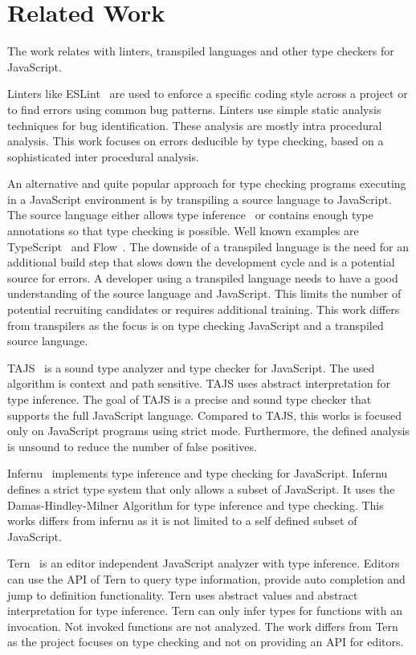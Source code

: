 \section{Related Work}\label{sec:related-work}
The work relates with linters, transpiled languages and other type checkers for JavaScript. 

Linters like ESLint~\cite{jQuery2016} are used to enforce a specific coding style across a project or to find errors using common bug patterns. Linters use simple static analysis techniques for bug identification. These analysis are mostly intra procedural analysis. This work focuses on errors deducible by type checking, based on a sophisticated inter procedural analysis. 


An alternative and quite popular approach for type checking programs executing in a JavaScript environment is by transpiling a source language to JavaScript. The source language either allows type inference~\cite{Ekblad2012, McKenna} or contains enough type annotations so that type checking is possible. Well known examples are TypeScript~\cite{Microsoft2012} and Flow~\cite{Facebook2014}. The downside of a transpiled language is the need for an additional build step that slows down the development cycle and is a potential source for errors. A developer using a transpiled language needs to have a good understanding of the source language and JavaScript. This limits the number of potential recruiting candidates or requires additional training. This work differs from transpilers as the focus is on type checking JavaScript and a transpiled source language.

TAJS~\cite{JensenMollerThiemann2009} is a sound type analyzer and type checker for JavaScript. The used algorithm is context and path sensitive. TAJS uses abstract interpretation for type inference. The goal of TAJS is a precise and sound type checker that supports the full JavaScript language. Compared to TAJS, this works is focused only on JavaScript programs using strict mode. Furthermore, the defined analysis is unsound to reduce the number of false positives.

Infernu~\cite{Lewis} implements type inference and type checking for JavaScript. Infernu defines a strict type system that only allows a subset of JavaScript. It uses the Damas-Hindley-Milner Algorithm for type inference and type checking. This works differs from infernu as it is not limited to a self defined subset of JavaScript.

Tern~\cite{Haverbeke} is an editor independent JavaScript analyzer with type inference. Editors can use the API of Tern to query type information, provide auto completion and jump to definition functionality. Tern uses abstract values and abstract interpretation for type inference. Tern can only infer types for functions with an invocation. Not invoked functions are not analyzed. The work differs from Tern as the project focuses on type checking and not on providing an API for editors. 